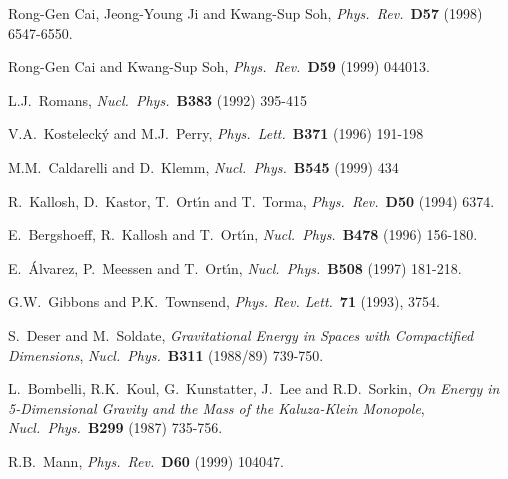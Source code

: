 \documentclass[12pt,a4paper]{article}
\begin{document}
\begin{thebibliography}{99}
 Rong-Gen Cai, Jeong-Young Ji and Kwang-Sup Soh,
                  {\it Phys.~Rev.}~{\bf D57} (1998) 6547-6550.

 Rong-Gen Cai and Kwang-Sup Soh,
                  {\it Phys.~Rev.}~{\bf D59} (1999) 044013.

 L.J.~Romans,
                 {\it Nucl.~Phys.}~{\bf B383} (1992) 395-415

 V.A.~Kosteleck\'y and M.J.~Perry,
                 {\it Phys.~Lett.}~{\bf B371} (1996) 191-198

 M.M.~Caldarelli and  D.~Klemm,
                 {\it Nucl.~Phys.}~{\bf B545} (1999) 434








 




 R.~Kallosh, D.~Kastor, T.~Ort\'{\i}n and T.~Torma,
                   {\it Phys.~Rev.}~{\bf D50} (1994) 6374.

 E.~Bergshoeff, R.~Kallosh and T.~Ort\'{\i}n,
                   {\it Nucl.~Phys.}~{\bf B478} (1996) 156-180.

 E.~\'Alvarez, P.~Meessen and T.~Ort\'{\i}n,
                  {\it Nucl.~Phys.}~{\bf B508} (1997) 181-218.


 G.W.~Gibbons and P.K.~Townsend,
                      {\it Phys. Rev. Lett.}~{\bf 71} (1993), 3754.








 S.~Deser and M.~Soldate,
                {\sl Gravitational Energy in Spaces with Compactified
                Dimensions},
                {\it Nucl.~Phys.}~{\bf B311} (1988/89) 739-750. 

 L.~Bombelli, R.K.~Koul, G.~Kunstatter, 
                   J.~Lee and R.D.~Sorkin,
                   {\sl On Energy in 5-Dimensional Gravity and the Mass
                   of the Kaluza-Klein Monopole},
                   {\it Nucl.~Phys.}~{\bf B299} (1987) 735-756.

 R.B.~Mann,
                  {\it Phys.~Rev.}~{\bf D60} (1999) 104047.


\end{thebibliography}
\end{document}
